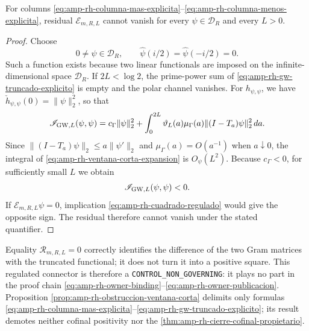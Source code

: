 \begin{proposition}
\label{prop:amp-rh-obstruccion-ventana-corta}
For columns \eqref{eq:amp-rh-columna-mas-explicita}--\eqref{eq:amp-rh-columna-menos-explicita}, residual \(\mathcal E_{m,R,L}\) cannot vanish for every \(\psi\in\mathcal D_R\) and every \(L>0\).
\end{proposition}

\begin{proof}
Choose
\[
 0\ne\psi\in\mathcal D_R,\qquad
 \widehat\psi(i/2)=\widehat\psi(-i/2)=0.
\]
Such a function exists because two linear functionals are imposed on the infinite-dimensional space \(\mathcal D_R\). If \(2L<\log2\), the prime-power sum of \eqref{eq:amp-rh-gw-truncado-explicito} is empty and the polar channel vanishes. For \(h_{\psi,\psi}\), we have \(\check h_{\psi,\psi}(0)=\|\psi\|_2^2\), so that
\begin{equation}\label{eq:amp-rh-ventana-corta-expansion}
 \mathscr I_{{\rm GW},L}(\psi,\psi)
 =c_\Gamma\|\psi\|_2^2+
 \int_0^{2L}\vartheta_L(a)\mu_\Gamma(a)
       \|(I-T_a)\psi\|_2^2\,da .
\end{equation}
Since \(\|(I-T_a)\psi\|_2\leq a\|\psi'\|_2\) and \(\mu_\Gamma(a)=O(a^{-1})\) when \(a\downarrow0\), the integral of \eqref{eq:amp-rh-ventana-corta-expansion} is \(O_\psi(L^2)\). Because \(c_\Gamma<0\), for sufficiently small \(L\) we obtain
\[
 \mathscr I_{{\rm GW},L}(\psi,\psi)<0.
\]
If \(\mathcal E_{m,R,L}\psi=0\), implication \eqref{eq:amp-rh-cuadrado-regulado} would give the opposite sign. The residual therefore cannot vanish under the stated quantifier.
\end{proof}

Equality \(\mathcal R_{m,R,L}=0\) correctly identifies the difference of the two Gram matrices with the truncated functional; it does not turn it into a positive square. This regulated connector is therefore a \texttt{CONTROL\_NON\_GOVERNING}: it plays no part in the proof chain \eqref{eq:amp-rh-owner-binding}--\eqref{eq:amp-rh-owner-publicacion}. Proposition \ref{prop:amp-rh-obstruccion-ventana-corta} delimits only formulas \eqref{eq:amp-rh-columna-mas-explicita}--\eqref{eq:amp-rh-gw-truncado-explicito}; its result demotes neither cofinal positivity nor the \cref{thm:amp-rh-cierre-cofinal-propietario}.
